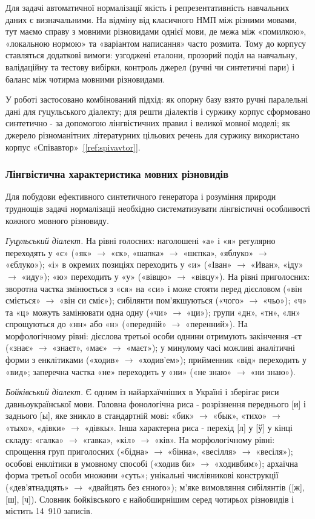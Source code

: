 \documentclass[14pt]{extarticle}
\newcommand{\citeref}[1]{\hyperref[#1]{[\ref*{#1}]}}
\begin{document}
Для задачі автоматичної нормалізації якість і репрезентативність навчальних даних є визначальними. На відміну від класичного НМП між різними мовами, тут маємо справу з мовними різновидами однієї мови, де межа між «помилкою», «локальною нормою» та «варіантом написання» часто розмита. Тому до корпусу ставляться додаткові вимоги: узгоджені еталони, прозорий поділ на навчальну, валідаційну та тестову вибірки, контроль джерел (ручні чи синтетичні пари) і баланс між чотирма мовними різновидами.

У роботі застосовано комбінований підхід: як опорну базу взято ручні паралельні дані для гуцульського діалекту; для решти діалектів і суржику корпус сформовано синтетично - за допомогою лінгвістичних правил і великої мовної моделі; як джерело різноманітних літературних цільових речень для суржику використано корпус «Співавтор»~\citeref{ref:spivavtor}.

\subsubsection{Лінгвістична характеристика мовних різновидів}

Для побудови ефективного синтетичного генератора і розуміння природи труднощів задачі нормалізації необхідно систематизувати лінгвістичні особливості кожного мовного різновиду.

\textit{Гуцульський діалект.} На рівні голосних: наголошені «а» і «я» регулярно переходять у «є» («як» $\to$ «єк», «шапка» $\to$ «шєпка», «яблуко» $\to$ «єблуко»); «і» в окремих позиціях переходить у «и» («Іван» $\to$ «Иван», «іду» $\to$ «иду»); «ю» переходить у «у» («вівцю» $\to$ «вівцу»). На рівні приголосних: зворотна частка змінюється з «ся» на «си» і може стояти перед дієсловом («він сміється» $\to$ «він си сміє»); сибілянти пом'якшуються («чого» $\to$ «чьо»); «ч» та «ц» можуть замінювати одна одну («чи» $\to$ «ци»); групи «дн», «тн», «лн» спрощуються до «нн» або «н» («передній» $\to$ «перенний»). На морфологічному рівні: дієслова третьої особи однини отримують закінчення -єт («знає» $\to$ «знаєт», «має» $\to$ «маєт»); у минулому часі можливі аналітичні форми з енклітиками («ходив» $\to$ «ходив'ем»); прийменник «від» переходить у «вид»; заперечна частка «не» переходить у «ни» («не знаю» $\to$ «ни знаю»).

\textit{Бойківський діалект.} Є одним із найархаїчніших в Україні і зберігає риси давньоукраїнської мови. Головна фонологічна риса - розрізнення переднього [и] і заднього [ы], яке зникло в стандартній мові: «бик» $\to$ «бык», «тихо» $\to$ «тыхо», «дівки» $\to$ «дівкы». Інша характерна риса - перехід [л] у [ў] у кінці складу: «галка» $\to$ «гавка», «кіл» $\to$ «ків». На морфологічному рівні: спрощення груп приголосних («бідна» $\to$ «бінна», «весілля» $\to$ «весіля»); особові енклітики в умовному способі («ходив би» $\to$ «ходивбим»); архаїчна форма третьої особи множини «суть»; унікальні числівникові конструкції («дев'ятнадцять» $\to$ «двайцять без єнного»); м'яке вимовляння сибілянтів ([ж], [ш], [ч]). Словник бойківського є найобширнішим серед чотирьох різновидів і містить 14~910 записів.
\end{document}
